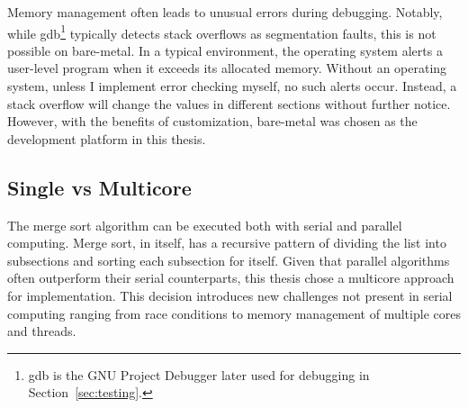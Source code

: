 Memory management often leads to unusual errors during debugging. Notably, while
gdb\footnote{gdb is the GNU Project Debugger later used for debugging in
Section~\ref{sec:testing}.} typically detects stack overflows as segmentation
faults, this is not possible on bare-metal. In a typical environment, the
operating system alerts a user-level program when it exceeds its allocated
memory. Without an operating system, unless I implement error checking myself,
no such alerts occur. Instead, a stack overflow will change the values in
different sections without further notice. However, with the benefits of
customization, bare-metal was chosen as the development platform in this thesis.



\subsection{Single vs Multicore}\label{sec:singlevsmulti}
The merge sort algorithm can be executed both with serial and parallel
computing. Merge sort, in itself, has a recursive pattern of dividing the list
into subsections and sorting each subsection for itself. Given that parallel
algorithms often outperform their serial counterparts, this thesis chose a
multicore approach for implementation\cite{comp_parallel}. This decision
introduces new challenges not present in serial computing ranging from race
conditions to memory management of multiple cores and threads.

